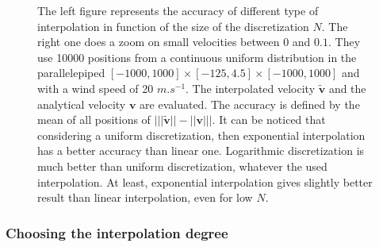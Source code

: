 \documentclass[final]{jcgt}
\begin{document}
\begin{figure}[ht]
	\centering
	\hfill
	\caption{The left figure represents the accuracy of different type of interpolation in function of the size of the discretization $N$. The right one does a zoom on small velocities between $0$ and $0.1$.
		They use 10000 positions from a continuous uniform distribution in the parallelepiped $[-1000,1000]\times[-125,4.5]\times[-1000, 1000]$ and with a wind speed of 20 $m.s^{-1}$.
		The interpolated velocity $\tilde{\mathbf{v}}$ and the analytical velocity $\mathbf{v}$ are evaluated.
		The accuracy is defined by the mean of all positions of $\big|||\tilde{\mathbf{v}}||-||\mathbf{v}||\big|$.
		It can be noticed that considering a uniform discretization, then exponential interpolation has a better accuracy than linear one.
		Logarithmic discretization is much better than uniform discretization, whatever the used interpolation.
		At least, exponential interpolation gives slightly better result than linear interpolation, even for low $N$.}
	\label{fig:interpolationAccuracyComparison}
\end{figure}

\subsubsection{Choosing the interpolation degree}
\end{document}
